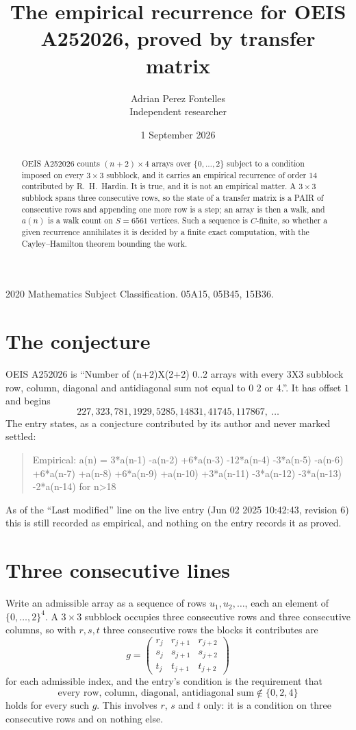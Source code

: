 \documentclass[11pt,a4paper]{article}
\title{The empirical recurrence for OEIS A252026, proved by transfer matrix}
\author{Adrian Perez Fontelles\\ \small Independent researcher}
\date{1 September 2026}
\theoremstyle{plain}
\theoremstyle{definition}
\begin{document}
\maketitle

\begin{abstract}
OEIS A252026 counts $(n+2)\times4$ arrays over $\{0,\dots,2\}$ subject to a condition imposed on
every $3\times3$ subblock, and it carries an empirical recurrence of order $14$
contributed by R.~H.~Hardin. It is true, and it is not an empirical matter. A $3\times3$
subblock spans three consecutive rows, so the state of a transfer matrix is a PAIR of
consecutive rows and appending one more row is a step; an array is then a walk, and
$a(n)$ is a walk count on $S=6561$ vertices. Such a sequence is $C$-finite, so whether a given
recurrence annihilates it is decided by a finite exact computation, with the Cayley--Hamilton
theorem bounding the work.
\end{abstract}

\noindent\small 2020 Mathematics Subject Classification. 05A15, 05B45, 15B36.\normalsize

\section{The conjecture}

OEIS A252026 is ``Number of (n+2)X(2+2) 0..2 arrays with every 3X3 subblock row, column, diagonal and antidiagonal sum not equal to 0 2 or 4.''. It has offset $1$ and begins
\[
227, 323, 781, 1929, 5285, 14831, 41745, 117867,\ \dots
\]
The entry states, as a conjecture contributed by its author and never marked settled:
\begin{quote}
Empirical: a(n) = 3*a(n-1) -a(n-2) +6*a(n-3) -12*a(n-4) -3*a(n-5) -a(n-6) +6*a(n-7) +a(n-8) +6*a(n-9) +a(n-10) +3*a(n-11) -3*a(n-12) -3*a(n-13) -2*a(n-14) for n>18
\end{quote}
As of the ``Last modified'' line on the live entry (Jun 02 2025 10:42:43, revision 6) this is still
recorded as empirical, and nothing on the entry records it as proved.

\section{Three consecutive lines}

Write an admissible array as a sequence of rows $u_1,u_2,\dots$, each an element of
$\{0,\dots,2\}^{4}$. A $3\times3$ subblock occupies three consecutive rows and
three consecutive columns, so with $r,s,t$ three consecutive rows the blocks it
contributes are
\[
g=\begin{pmatrix}r_j&r_{j+1}&r_{j+2}\\ s_j&s_{j+1}&s_{j+2}\\ t_j&t_{j+1}&t_{j+2}\end{pmatrix}
\]
for each admissible index, and the entry's condition is the requirement that
\[
\text{every row, column, diagonal, antidiagonal sum} \notin \{0,2,4\}
\]
holds for every such $g$. This involves $r$, $s$ and $t$ only: it is a condition on
three consecutive rows and on nothing else.
\end{document}
